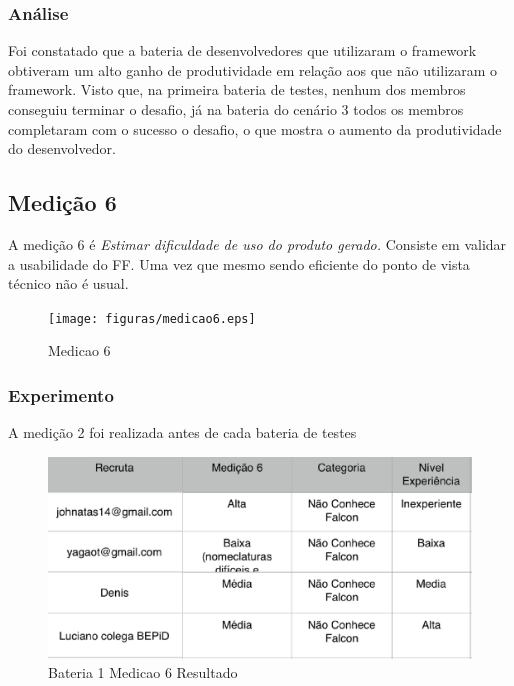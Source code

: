 \subsubsection{Análise}

Foi constatado que a bateria de desenvolvedores que utilizaram o framework obtiveram um alto ganho de produtividade
em relação aos que não utilizaram o framework. Visto que, na primeira bateria de testes, nenhum dos membros conseguiu
terminar o desafio, já na bateria do cenário 3 todos os membros completaram com o sucesso o desafio, o que mostra o
aumento da produtividade do desenvolvedor.

\subsection{Medição 6}

A medição 6 é \textit{Estimar dificuldade de uso do produto gerado.} Consiste em validar a usabilidade do FF. Uma vez que
mesmo sendo eficiente do ponto de vista técnico não é usual.

\begin{figure}[H]
  \centering
  \label{fig:indicadores}
  \texttt{[image: figuras/medicao6.eps]}
  \caption{Medicao 6}
\end{figure}

\subsubsection{Experimento}

A medição 2 foi realizada antes de cada bateria de testes


\begin{figure}[H]
  \centering
  \label{fig:indicadores}
  \includegraphics[keepaspectratio=true,scale=0.6]{figuras/Bateria1Medicao6.eps}
  \caption{Bateria 1 Medicao 6 Resultado}
\end{figure}

